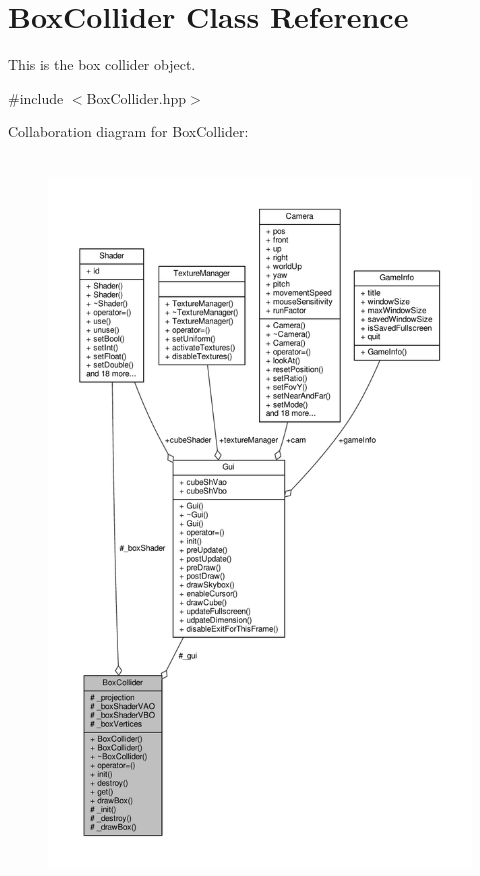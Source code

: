 \hypertarget{class_box_collider}{}\section{Box\+Collider Class Reference}
\label{class_box_collider}


This is the box collider object.  




{\ttfamily \#include $<$Box\+Collider.\+hpp$>$}



Collaboration diagram for Box\+Collider\+:
\nopagebreak
\begin{figure}[H]
\begin{center}
\leavevmode
\includegraphics[height=550pt]{class_box_collider__coll__graph}
\end{center}
\end{figure}
